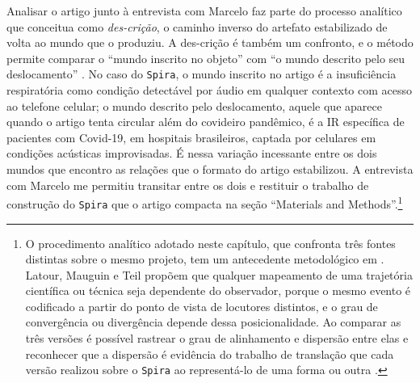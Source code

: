 Analisar o artigo junto à entrevista com Marcelo faz parte do processo analítico que \textcite{Akrich1992Description} conceitua como \textit{des-crição}, o caminho inverso do artefato estabilizado de volta ao mundo que o produziu. A des-crição é também um confronto, e o método permite comparar o \enquote{mundo inscrito no objeto} com \enquote{o mundo descrito pelo seu deslocamento} \parencite{Akrich1992Description}. No caso do \texttt{Spira}, o mundo inscrito no artigo é a insuficiência respiratória como condição detectável por áudio em qualquer contexto com acesso ao telefone celular; o mundo descrito pelo deslocamento, aquele que aparece quando o artigo tenta circular além do covideiro pandêmico, é a IR específica de pacientes com Covid-19, em hospitais brasileiros, captada por celulares em condições acústicas improvisadas. É nessa variação incessante entre os dois mundos que encontro as relações que o formato do artigo estabilizou. A entrevista com Marcelo me permitiu transitar entre os dois e restituir o trabalho de construção do \texttt{Spira} que o artigo compacta na seção \enquote{Materials and Methods}.\footnote{O procedimento analítico adotado neste capítulo, que confronta três fontes distintas sobre o mesmo projeto, tem um antecedente metodológico em \textcite{LatourMauguinTeil1992}. Latour, Mauguin e Teil propõem que qualquer mapeamento de uma trajetória científica ou técnica seja dependente do observador, porque o mesmo evento é codificado a partir do ponto de vista de locutores distintos, e o grau de convergência ou divergência depende dessa posicionalidade. Ao comparar as três versões é possível rastrear o grau de alinhamento e dispersão entre elas e reconhecer que a dispersão é evidência do trabalho de translação que cada versão realizou sobre o \texttt{Spira} ao representá-lo de uma forma ou outra \parencite{LatourMauguinTeil1992}.}

